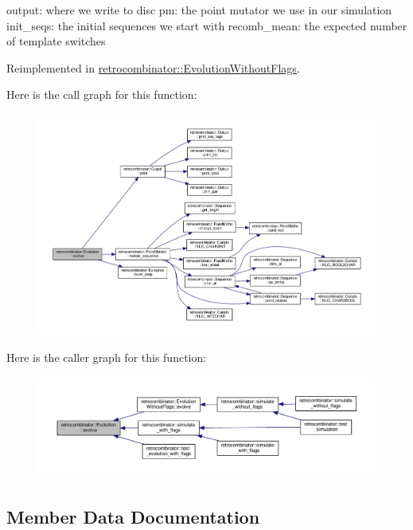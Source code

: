 output\+: where we write to disc pm\+: the point mutator we use in our simulation init\+\_\+seqs\+: the initial sequences we start with recomb\+\_\+mean\+: the expected number of template switches 

Reimplemented in \hyperlink{classretrocombinator_1_1EvolutionWithoutFlags_a9e27b532826998a88d2c157daf53c447}{retrocombinator\+::\+Evolution\+Without\+Flags}.

Here is the call graph for this function\+:
\nopagebreak
\begin{figure}[H]
\begin{center}
\leavevmode
\includegraphics[width=350pt]{classretrocombinator_1_1Evolution_a0b8a181242ea8ee3072258fa7ed416f4_cgraph}
\end{center}
\end{figure}
Here is the caller graph for this function\+:
\nopagebreak
\begin{figure}[H]
\begin{center}
\leavevmode
\includegraphics[width=350pt]{classretrocombinator_1_1Evolution_a0b8a181242ea8ee3072258fa7ed416f4_icgraph}
\end{center}
\end{figure}


\subsection{Member Data Documentation}
\mbox{\label{classretrocombinator_1_1Evolution_a163715452c511724ecc0ef16a5030dea}} 
